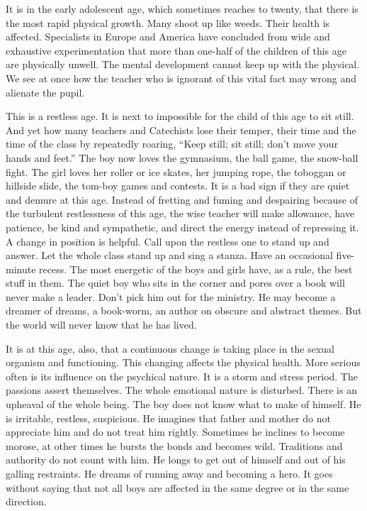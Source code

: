 It is in the early adolescent age, which sometimes reaches to twenty, that there is the most rapid physical growth. Many shoot up like weeds. Their health is affected. Specialists in Europe and America have concluded from wide and exhaustive experimentation that more than one-half of the children
of this age are physically unwell. The mental development cannot keep up with the physical. We see at once how the teacher who is ignorant of this vital fact may wrong and alienate the pupil.

This is a restless age. It is next to impossible for the child of this age to sit still. And yet how many teachers and Catechists lose their temper, their time and the time of the class by repeatedly roaring, “Keep still; sit still; don’t move your hands and feet.” The boy now loves the gymnasium, the ball game, the snow-ball fight. The girl loves her roller or ice skates, her jumping rope, the toboggan or hillside slide, the tom-boy games and contests. It is a bad sign if they are quiet and demure at this age. Instead of fretting and fuming and despairing because of the turbulent restlessness of this age, the wise teacher will make allowance, have patience, be kind and sympathetic, and direct the energy instead of repressing it. A change in position is helpful. Call upon the restless one to stand up and answer. Let the whole class stand up and sing a stanza. Have an occasional five-minute recess. The most energetic of the boys and girls have, as a rule, the best stuff in them. The quiet boy who sits in the corner and pores over a book will never make a leader. Don’t pick him out for the ministry. He may become a dreamer of dreams, a book-worm, an author on obscure and abstract themes. But the world will never know that he has lived.

It is at this age, also, that a continuous change is taking place in the sexual organism and functioning. This changing affects the physical health. More serious often is its influence on the psychical nature. It is a storm and stress period. The passions assert themselves. The whole emotional nature is disturbed. There is an upheaval of the whole being. The boy does not know what to make of himself. He is irritable, restless, suspicious. He imagines that father and mother do not appreciate him and do not treat him rightly. Sometimes he inclines to become morose, at other times he bursts the bonds and becomes wild. Traditions and authority do not count with him. He longs to get out of himself and out of his galling restraints. He dreams of running away and becoming a hero. It goes without saying that not all boys are affected in the same degree or in the same direction.

